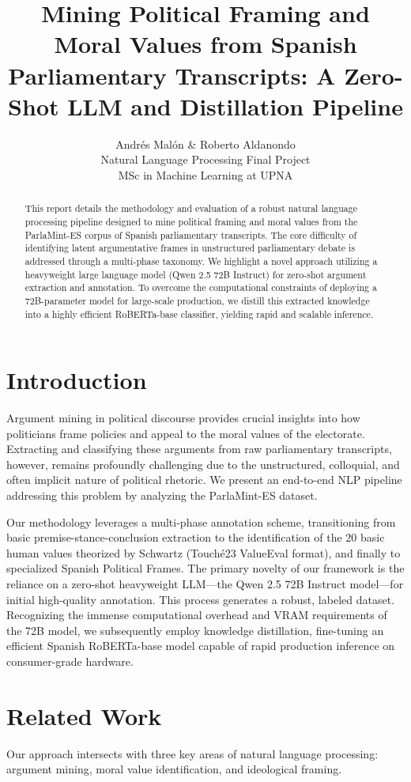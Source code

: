 \documentclass[11pt,a4paper]{article}
\title{Mining Political Framing and Moral Values from Spanish Parliamentary Transcripts: A Zero-Shot LLM and Distillation Pipeline}
\author{
  Andrés Malón \& Roberto Aldanondo \\
  Natural Language Processing Final Project \\
  MSc in Machine Learning at UPNA
}
\date{}
\begin{document}
\maketitle
\begin{abstract}
This report details the methodology and evaluation of a robust natural language processing pipeline designed to mine political framing and moral values from the ParlaMint-ES corpus of Spanish parliamentary transcripts. The core difficulty of identifying latent argumentative frames in unstructured parliamentary debate is addressed through a multi-phase taxonomy. We highlight a novel approach utilizing a heavyweight large language model (Qwen 2.5 72B Instruct) for zero-shot argument extraction and annotation. To overcome the computational constraints of deploying a 72B-parameter model for large-scale production, we distill this extracted knowledge into a highly efficient RoBERTa-base classifier, yielding rapid and scalable inference. 
\end{abstract}

\section{Introduction}
Argument mining in political discourse provides crucial insights into how politicians frame policies and appeal to the moral values of the electorate. Extracting and classifying these arguments from raw parliamentary transcripts, however, remains profoundly challenging due to the unstructured, colloquial, and often implicit nature of political rhetoric. We present an end-to-end NLP pipeline addressing this problem by analyzing the ParlaMint-ES dataset.

Our methodology leverages a multi-phase annotation scheme, transitioning from basic premise-stance-conclusion extraction to the identification of the 20 basic human values theorized by Schwartz (Touché23 ValueEval format), and finally to specialized Spanish Political Frames. The primary novelty of our framework is the reliance on a zero-shot heavyweight LLM—the Qwen 2.5 72B Instruct model—for initial high-quality annotation. This process generates a robust, labeled dataset. Recognizing the immense computational overhead and VRAM requirements of the 72B model, we subsequently employ knowledge distillation, fine-tuning an efficient Spanish RoBERTa-base model capable of rapid production inference on consumer-grade hardware.

\section{Related Work}
Our approach intersects with three key areas of natural language processing: argument mining, moral value identification, and ideological framing.
\end{document}
